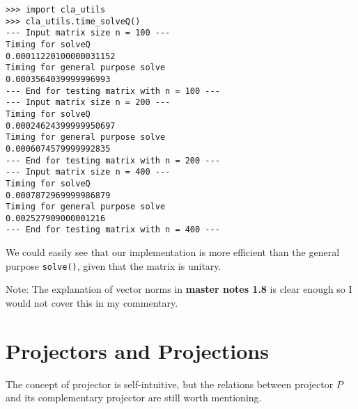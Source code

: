 \bigskip
\begin{lstlisting}
>>> import cla_utils
>>> cla_utils.time_solveQ()
--- Input matrix size n = 100 ---
Timing for solveQ
0.00011220100000031152
Timing for general purpose solve
0.0003564039999996993
--- End for testing matrix with n = 100 ---
--- Input matrix size n = 200 ---
Timing for solveQ
0.00024624399999950697
Timing for general purpose solve
0.0006074579999992835
--- End for testing matrix with n = 200 ---
--- Input matrix size n = 400 ---
Timing for solveQ
0.0007872969999986879
Timing for general purpose solve
0.002527909000001216
--- End for testing matrix with n = 400 ---
\end{lstlisting}
We could easily see that our implementation is more efficient than the general purpose \texttt{solve()}, given that the matrix is unitary.

\medskip
\noindent Note: The explanation of vector norms in \textbf{master notes 1.8} is clear enough so I would not cover this in my commentary.

\section{Projectors and Projections}%
The concept of projector is self-intuitive, but the relations between projector $P$ and its complementary projector are still worth mentioning.

